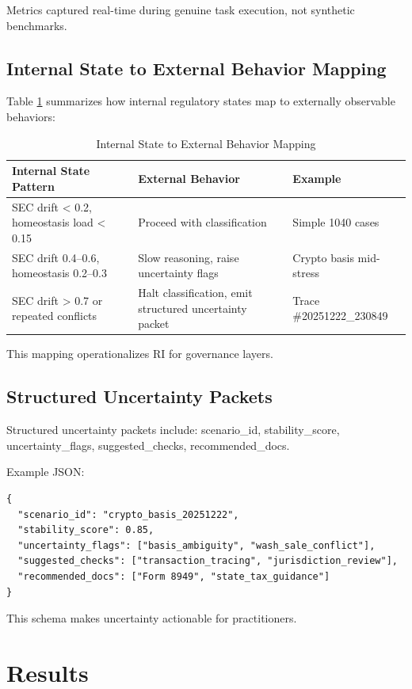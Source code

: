 \documentclass[12pt,a4paper]{article}
\begin{document}
Metrics captured real-time during genuine task execution, not synthetic benchmarks.

\subsection{Internal State to External Behavior Mapping}

Table \ref{tab:state_behavior_mapping} summarizes how internal regulatory states map to externally observable behaviors:

\begin{table}[H]
\caption{Internal State to External Behavior Mapping}
\label{tab:state_behavior_mapping}
\begin{tabular}{p{4cm} p{4cm} p{3cm}}
\toprule
\textbf{Internal State Pattern} & \textbf{External Behavior} & \textbf{Example} \\
\midrule
SEC drift < 0.2, homeostasis load < 0.15 & Proceed with classification & Simple 1040 cases \\
SEC drift 0.4–0.6, homeostasis 0.2–0.3 & Slow reasoning, raise uncertainty flags & Crypto basis mid-stress \\
SEC drift > 0.7 or repeated conflicts & Halt classification, emit structured uncertainty packet & Trace \#20251222\_230849 \\
\bottomrule
\end{tabular}
\end{table}

This mapping operationalizes RI for governance layers.

\subsection{Structured Uncertainty Packets}

Structured uncertainty packets include: scenario\_id, stability\_score, uncertainty\_flags, suggested\_checks, recommended\_docs.

Example JSON:
\begin{verbatim}
{
  "scenario_id": "crypto_basis_20251222",
  "stability_score": 0.85,
  "uncertainty_flags": ["basis_ambiguity", "wash_sale_conflict"],
  "suggested_checks": ["transaction_tracing", "jurisdiction_review"],
  "recommended_docs": ["Form 8949", "state_tax_guidance"]
}
\end{verbatim}

This schema makes uncertainty actionable for practitioners.

\section{Results}
\end{document}
